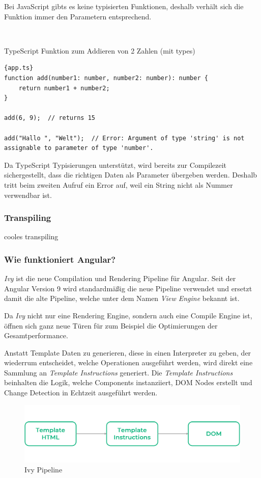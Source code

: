 Bei JavaScript gibts es keine typisierten Funktionen, deshalb verhält sich die Funktion immer den Parametern entsprechend.

\

TypeScript Funktion zum Addieren von 2 Zahlen (mit types)
\begin{lstlisting}[label={lst:add-function-ts}]{app.ts}
function add(number1: number, number2: number): number {
    return number1 + number2;
}

add(6, 9);  // returns 15

add("Hallo ", "Welt");  // Error: Argument of type 'string' is not assignable to parameter of type 'number'.
\end{lstlisting}

Da TypeScript Typisierungen unterstützt, wird bereits zur Compilezeit sichergestellt, dass die richtigen Daten als Parameter übergeben werden.
Deshalb tritt beim zweiten Aufruf ein Error auf, weil ein String nicht als Nummer verwendbar ist.

\cite{typescript-landing-page, what-is-typescript}

\subsubsection{Transpiling}
\label{subsubsec:transpiling}
cooles transpiling

\subsubsection{Wie funktioniert Angular?}
\emph{Ivy} ist die neue Compilation und Rendering Pipeline für Angular.
Seit der Angular Version 9 wird standardmäßig die neue Pipeline verwendet und ersetzt damit die alte Pipeline,
welche unter dem Namen \emph{View Engine} bekannt ist.

Da \emph{Ivy} nicht nur eine Rendering Engine, sondern auch eine Compile Engine ist, öffnen sich ganz neue Türen für zum
Beispiel die Optimierungen der Gesamtperformance.

Anstatt Template Daten zu generieren, diese in einen Interpreter zu geben, der wiederrum entscheidet, welche Operationen
ausgeführt werden, wird direkt eine Sammlung an \emph{Template Instructions} generiert.
Die \emph{Template Instructions} beinhalten die Logik, welche Components instanziiert, DOM Nodes erstellt und Change Detection in Echtzeit ausgeführt werden.

\begin{figure}[hbt!]
    \centering
    \includegraphics[scale=.4]{pics/ivy-pipeline}
    \caption{Ivy Pipeline}
    \label{fig:ivy-pipeline}
\end{figure}

